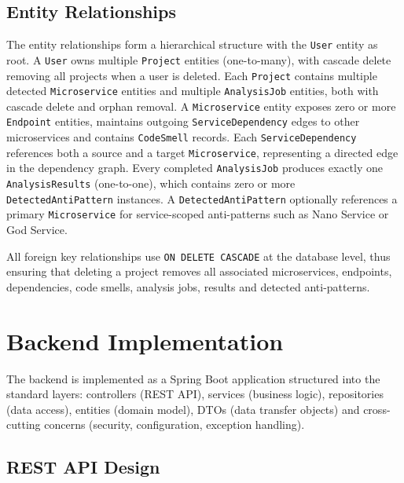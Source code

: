 \subsection{Entity Relationships}
\label{subsec:entity-relationships}

 \par The entity relationships form a hierarchical structure with the \texttt{User} entity as root. A \texttt{User} owns multiple \texttt{Project} entities (one-to-many), with cascade delete removing all projects when a user is deleted. Each \texttt{Project} contains multiple detected \texttt{Microservice} entities and multiple \texttt{AnalysisJob} entities, both with cascade delete and orphan removal. A \texttt{Microservice} entity exposes zero or more \texttt{Endpoint} entities, maintains outgoing \texttt{ServiceDependency} edges to other microservices and contains \texttt{CodeSmell} records. Each \texttt{ServiceDependency} references both a source and a target \texttt{Microservice}, representing a directed edge in the dependency graph. Every completed \texttt{AnalysisJob} produces exactly one \texttt{A\-nal\-y\-sisResults} (one-to-one), which contains zero or more \texttt{DetectedAntiPattern} instances. A \texttt{DetectedAntiPattern} optionally references a primary \texttt{Micro\-service} for service-scoped anti-patterns such as Nano Service or God Service.

All foreign key relationships use \texttt{ON DELETE CASCADE} at the database level, thus ensuring that deleting a project removes all associated microservices, endpoints, dependencies, code smells, analysis jobs, results and detected anti-patterns.


\section{Backend Implementation}
\label{sec:backend-impl}

 \par The backend is implemented as a Spring Boot application structured into the standard layers: controllers (REST API), services (business logic), repositories (data access), entities (domain model), DTOs (data transfer objects) and cross-cutting concerns (security, configuration, exception handling).

\subsection{REST API Design}
\label{subsec:rest-api}

